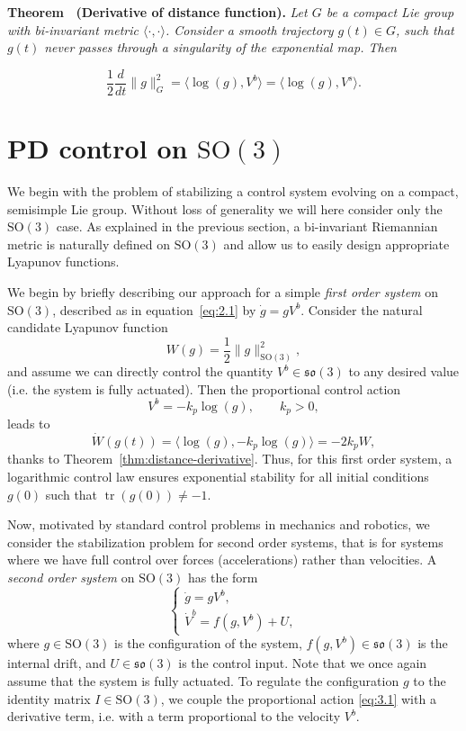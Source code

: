 \documentclass[11pt]{article}
\newcommand{\SO}{\mathrm{SO}}
\newcommand{\so}{\mathfrak{so}}
\newcommand{\tr}{\operatorname{tr}}
\newcounter{papertheorem}
\renewcommand{\thepapertheorem}{\arabic{papertheorem}}
\newcommand{\papertheorem}[3]{\refstepcounter{papertheorem}\par\medskip\noindent\textbf{Theorem \thepapertheorem\ (#1).}\label{#2} \textit{#3}\par}
\begin{document}
\papertheorem{Derivative of distance function}{thm:distance-derivative}{Let $G$ be a compact Lie group with bi-invariant metric $\langle\cdot,\cdot\rangle$. Consider a smooth trajectory $g(t)\in G$, such that $g(t)$ never passes through a singularity of the exponential map. Then}
\begin{equation*}
\frac12\frac{d}{dt}\|g\|_G^2=\langle\log(g),V^b\rangle=\langle\log(g),V^s\rangle.
\end{equation*}

\section{PD control on $\SO(3)$}\label{sec:pd-so3}
We begin with the problem of stabilizing a control system evolving on a compact, semisimple Lie group. Without loss of generality we will here consider only the $\SO(3)$ case. As explained in the previous section, a bi-invariant Riemannian metric is naturally defined on $\SO(3)$ and allow us to easily design appropriate Lyapunov functions.


We begin by briefly describing our approach for a simple \emph{first order system} on $\SO(3)$, described as in equation~\eqref{eq:2.1} by $\dot g=gV^b$. Consider the natural candidate Lyapunov function
\begin{equation*}
W(g)=\frac12\|g\|_{\SO(3)}^2,
\end{equation*}
and assume we can directly control the quantity $V^b\in\so(3)$ to any desired value (i.e. the system is fully actuated). Then the proportional control action
\begin{equation*}
V^b=-k_p\log(g),\qquad k_p>0,\tag{3.1}\label{eq:3.1}
\end{equation*}
leads to
\begin{equation*}
\dot W(g(t))=\langle\log(g),-k_p\log(g)\rangle=-2k_pW,
\end{equation*}
thanks to Theorem~\ref{thm:distance-derivative}. Thus, for this first order system, a logarithmic control law ensures exponential stability for all initial conditions $g(0)$ such that $\tr(g(0))\neq-1$.

Now, motivated by standard control problems in mechanics and robotics, we consider the stabilization problem for second order systems, that is for systems where we have full control over forces (accelerations) rather than velocities. A \emph{second order system} on $\SO(3)$ has the form
\begin{equation*}
\begin{cases}
\dot g=gV^b,\\
\dot V^b=f(g,V^b)+U,
\end{cases}\tag{3.2}\label{eq:3.2}
\end{equation*}
where $g\in\SO(3)$ is the configuration of the system, $f(g,V^b)\in\so(3)$ is the internal drift, and $U\in\so(3)$ is the control input. Note that we once again assume that the system is fully actuated. To regulate the configuration $g$ to the identity matrix $I\in\SO(3)$, we couple the proportional action \eqref{eq:3.1} with a derivative term, i.e. with a term proportional to the velocity $V^b$.
\end{document}

